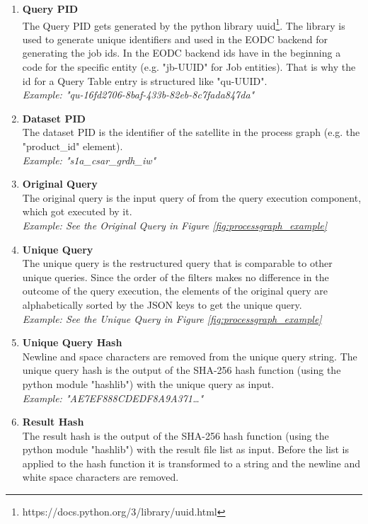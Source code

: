 \documentclass[draft,final]{vutinfth} %
\begin{document}
\begin{enumerate}
	\item \textbf{Query PID} \\
	The Query PID gets generated by the python library uuid\footnote{https://docs.python.org/3/library/uuid.html}. The library is used to generate unique identifiers and used in the EODC backend for generating the job ids. In the EODC backend ids have in the beginning a code for the specific entity (e.g. "jb-UUID" for Job entities). That is why the id for a Query Table entry is structured like "qu-UUID". \\
	\textit{Example: "qu-16fd2706-8baf-433b-82eb-8c7fada847da"}
	\item \textbf{Dataset PID} \\
	The dataset PID is the identifier of the satellite in the process graph (e.g. the "product\_id" element). \\
	\textit{Example: "s1a\_csar\_grdh\_iw"}	    	
	\item\textbf{Original Query} \\
	The original query is the input query of from the query execution component, which got executed by it.  \\ 
	\textit{Example: See the Original Query in Figure \ref{fig:processgraph_example}}	 
	\item \textbf{Unique Query} \\
	The unique query is the restructured query that is comparable to other unique queries. Since the order of the filters makes no difference in the outcome of the query execution, the elements of the original query are alphabetically sorted by the JSON keys to get the unique query. \\
	\textit{Example: See the Unique Query in Figure \ref{fig:processgraph_example}}	  	 	
	\item \textbf{Unique Query Hash} \\ 
	Newline and space characters are removed from the unique query string. The unique query hash is the output of the SHA-256 hash function (using the python module "hashlib") with the unique query as input.  \\
	\textit{Example: "AE7EF888CDEDF8A9A371\dots"} 
	\item \textbf{Result Hash} \\
	The result hash is the output of the SHA-256 hash function (using the python module "hashlib") with the result file list as input. Before the list is applied to the hash function it is transformed to a string and the newline and white space characters are removed. \\

\end{enumerate}
\end{document}
